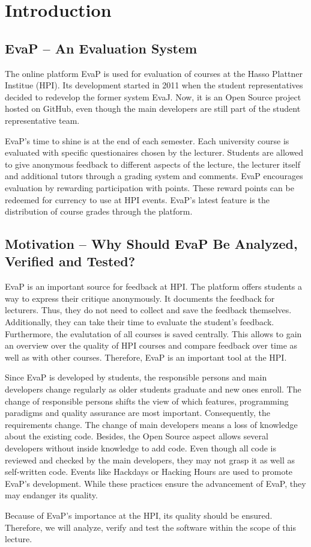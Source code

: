 \section{Introduction}

\subsection{EvaP -- An Evaluation System}
The online platform EvaP is used for evaluation of courses at the Hasso Plattner Institue (HPI). 
Its development started in 2011 when the student representatives decided to redevelop the former system EvaJ.
Now, it is an Open Source project hosted on GitHub, even though the main developers are still part of the student representative team.

EvaP's time to shine is at the end of each semester. 
Each university course is evaluated with specific questionaires chosen by the lecturer. 
Students are allowed to give anonymous feedback to different aspects of the lecture, the lecturer itself and additional tutors through a grading system and comments.
EvaP encourages evaluation by rewarding participation with points. 
These reward points can be redeemed for currency to use at HPI events.
EvaP's latest feature is the distribution of course grades through the platform.

\subsection{Motivation -- Why Should EvaP Be Analyzed, Verified and Tested?}
EvaP is an important source for feedback at HPI. 
The platform offers students a way to express their critique anonymously.
It documents the feedback for lecturers.
Thus, they do not need to collect and save the feedback themselves.
Additionally, they can take their time to evaluate the student's feedback.
Furthermore, the evalutation of all courses is saved centrally.
This allows to gain an overview over the quality of HPI courses and compare feedback over time as well as with other courses.
Therefore, EvaP is an important tool at the HPI.

Since EvaP is developed by students, the responsible persons and main developers change regularly as older students graduate and new ones enroll.
The change of responsible persons shifts the view of which features, programming paradigms and quality assurance are most important.
Consequently, the requirements change.
The change of main developers means a loss of knowledge about the existing code.
Besides, the Open Source aspect allows several developers without inside knowledge to add code.
Even though all code is reviewed and checked by the main developers, they may not grasp it as well as self-written code.
Events like Hackdays or Hacking Hours are used to promote EvaP's development.
While these practices ensure the advancement of EvaP, they may endanger its quality.

Because of EvaP's importance at the HPI, its quality should be ensured.
Therefore, we will analyze, verify and test the software within the scope of this lecture.
